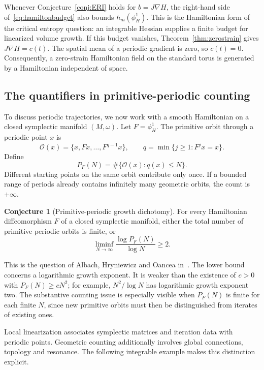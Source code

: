 \documentclass[review,12pt,times,a4paper,nopreprintline]{elsarticle}
\theoremstyle{plain}
\theoremstyle{definition}
\newtheorem{conjecture}[theorem]{Conjecture}
\theoremstyle{remark}
\numberwithin{equation}{section}
\begin{document}
Whenever Conjecture~\ref{conj:ERI} holds for $b=J\nabla H$, the right-hand side of~\eqref{eq:hamiltonbudget} also bounds $h_m(\phi_H^1)$. This is the Hamiltonian form of the critical entropy question: an integrable Hessian supplies a finite budget for linearized volume growth. If this budget vanishes, Theorem~\ref{thm:zerostrain} gives $J\nabla H=c(t)$. The spatial mean of a periodic gradient is zero, so $c(t)=0$. Consequently, a zero-strain Hamiltonian field on the standard torus is generated by a Hamiltonian independent of space.

\subsection{The quantifiers in primitive-periodic counting}
To discuss periodic trajectories, we now work with a smooth Hamiltonian on a closed symplectic manifold $(M,\omega)$. Let $F=\phi_H^1$. The primitive orbit through a periodic point $x$ is
\[
 \mathcal O(x)=\{x,Fx,\ldots,F^{q-1}x\},\qquad
 q=\min\{j\geq1:F^jx=x\}.
\]
Define
\begin{equation}\label{eq:periodcount}
 P_F(N)=\#\{\mathcal O(x):q(x)\leq N\}.
\end{equation}
Different starting points on the same orbit contribute only once. If a bounded range of periods already contains infinitely many geometric orbits, the count is $+\infty$.

\begin{conjecture}[Primitive-periodic growth dichotomy]\label{conj:periodic}
For every Hamiltonian diffeomorphism $F$ of a closed symplectic manifold, either the total number of primitive periodic orbits is finite, or
\begin{equation}\label{eq:periodgrowth}
 \liminf_{N\to\infty}\frac{\log P_F(N)}{\log N}\geq2.
\end{equation}
\end{conjecture}
This is the question of Albach, Hryniewicz and Oancea in~\cite[Problem 1 in their contribution]{OpenProblems2026}. The lower bound concerns a logarithmic growth exponent. It is weaker than the existence of $c>0$ with $P_F(N)\geq cN^2$; for example, $N^2/\log N$ has logarithmic growth exponent two. The substantive counting issue is especially visible when $P_F(N)$ is finite for each finite $N$, since new primitive orbits must then be distinguished from iterates of existing ones.

Local linearization associates symplectic matrices and iteration data with periodic points. Geometric counting additionally involves global connections, topology and resonance. The following integrable example makes this distinction explicit.
\end{document}
